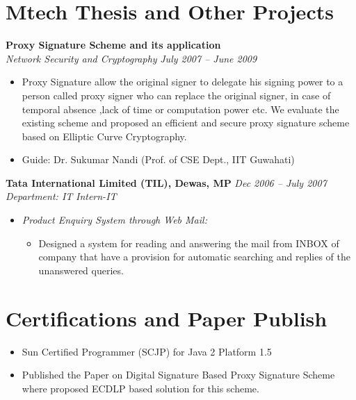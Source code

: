 \documentclass[margin,line]{resume}
\begin{document}
\begin{resume}
    \section{\mysidestyle Mtech Thesis and Other Projects}

    \textbf{Proxy Signature Scheme and its application}\vspace{0mm}\\\vspace{0mm}%
    \textsl{Network Security and Cryptography}  \hfill \textsl{July 2007 -- June 2009}
       \begin{itemize}
	\item Proxy Signature allow the original signer to delegate his signing power to a person 
         called proxy signer  who can replace the original signer, in case of temporal absence ,lack of time or computation power etc.
        We evaluate the existing scheme and proposed an efficient and secure proxy signature scheme based on Elliptic Curve 
        Cryptography. 
	\item Guide: Dr. Sukumar Nandi (Prof. of CSE Dept., IIT Guwahati)
       \end{itemize}
       
    \textbf{Tata International Limited (TIL), Dewas, MP} \hfill \textsl{Dec 2006 -- July 2007}\vspace{0mm}\\\vspace{0mm}%
    \textsl{Department: IT} \hfill \textsl{Intern-IT}
     \begin{itemize}
     \item \textsl{Product Enquiry System through Web Mail:} 
            \begin{itemize}
             \item Designed a system for reading and answering the mail from INBOX of company that have a provision for automatic searching and replies of the unanswered queries.
	      \end{itemize}
     \end{itemize}

    \section{\mysidestyle Certifications and Paper Publish}
     \begin{itemize}
      \item Sun Certified Programmer (SCJP) for Java 2 Platform 1.5
      \item Published the Paper on Digital Signature Based Proxy Signature Scheme where proposed ECDLP based solution for this scheme.
\end{itemize}


\end{resume}
\end{document}
